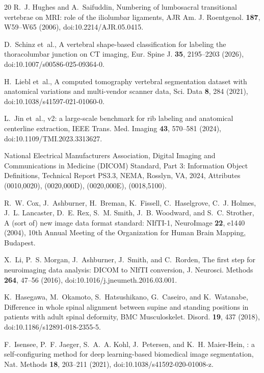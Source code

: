 \documentclass[aapm,mph,amsmath,amssymb,preprint,linenumbers]{revtex4-2}
\begin{document}
\begin{thebibliography}{20}
R.~J. Hughes and A.~Saifuddin,
\newblock Numbering of lumbosacral transitional vertebrae on {MRI}: role of the iliolumbar ligaments,
\newblock AJR Am. J. Roentgenol. {\bf 187}, W59--W65 (2006),
\newblock doi:10.2214/AJR.05.0415.

D.~Schinz et~al.,
\newblock A vertebral shape-based classification for labeling the thoracolumbar junction on {CT} imaging,
\newblock Eur. Spine J. {\bf 35}, 2195--2203 (2026),
\newblock doi:10.1007/s00586-025-09364-0.

H.~Liebl et~al.,
\newblock A computed tomography vertebral segmentation dataset with anatomical variations and multi-vendor scanner data,
\newblock Sci. Data {\bf 8}, 284 (2021),
\newblock doi:10.1038/s41597-021-01060-0.

L.~Jin et~al.,
 v2: a large-scale benchmark for rib labeling and anatomical centerline extraction,
\newblock IEEE Trans. Med. Imaging {\bf 43}, 570--581 (2024),
\newblock doi:10.1109/TMI.2023.3313627.

{National Electrical Manufacturers Association},
\newblock Digital Imaging and Communications in Medicine ({DICOM}) Standard, Part 3: Information Object Definitions,
\newblock Technical Report PS3.3, NEMA, Rosslyn, VA, 2024,
\newblock Attributes (0010,0020), (0020,000D), (0020,000E), (0018,5100).

R.~W. Cox, J.~Ashburner, H.~Breman, K.~Fissell, C.~Haselgrove, C.~J. Holmes, J.~L. Lancaster, D.~E. Rex, S.~M. Smith, J.~B. Woodward, and S.~C. Strother,
\newblock A (sort of) new image data format standard: {NIfTI-1},
\newblock NeuroImage {\bf 22}, e1440 (2004),
\newblock 10th Annual Meeting of the Organization for Human Brain Mapping, Budapest.

X.~Li, P.~S. Morgan, J.~Ashburner, J.~Smith, and C.~Rorden,
\newblock The first step for neuroimaging data analysis: {DICOM} to {NIfTI} conversion,
\newblock J. Neurosci. Methods {\bf 264}, 47--56 (2016),
\newblock doi:10.1016/j.jneumeth.2016.03.001.

K.~Hasegawa, M.~Okamoto, S.~Hatsushikano, G.~Caseiro, and K.~Watanabe,
\newblock Difference in whole spinal alignment between supine and standing positions in patients with adult spinal deformity,
\newblock BMC Musculoskelet. Disord. {\bf 19}, 437 (2018),
\newblock doi:10.1186/s12891-018-2355-5.

F.~Isensee, P.~F. Jaeger, S.~A.~A. Kohl, J.~Petersen, and K.~H. Maier-Hein,
: a self-configuring method for deep learning-based biomedical image segmentation,
\newblock Nat. Methods {\bf 18}, 203--211 (2021),
\newblock doi:10.1038/s41592-020-01008-z.


\end{thebibliography}
\end{document}
